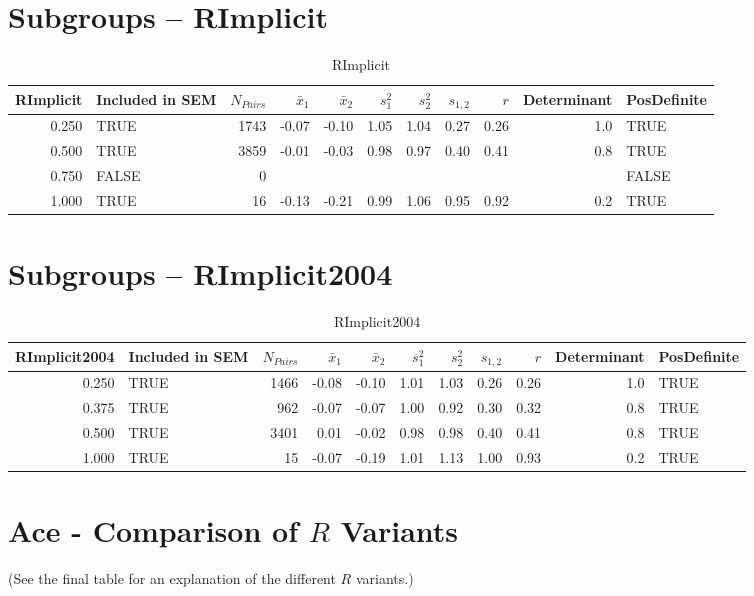 \documentclass{article}\usepackage[]{graphicx}\usepackage[]{color}
\begin{document}
\section{Subgroups --  RImplicit }%
\begin{table}[ht]
\centering
\begin{tabular}{rlrrrrrrrrl}
  \hline
RImplicit & Included in SEM & $N_{Pairs}$ & $\bar{x}_1$ & $\bar{x}_2$ & $s_1^2$ & $s_2^2$ & $s_{1,2}$ & $r$ & Determinant & PosDefinite \\ 
  \hline
0.250 & TRUE & 1743 & -0.07 & -0.10 & 1.05 & 1.04 & 0.27 & 0.26 & 1.0 & TRUE \\ 
  0.500 & TRUE & 3859 & -0.01 & -0.03 & 0.98 & 0.97 & 0.40 & 0.41 & 0.8 & TRUE \\ 
  0.750 & FALSE & 0 &  &  &  &  &  &  &  & FALSE \\ 
  1.000 & TRUE & 16 & -0.13 & -0.21 & 0.99 & 1.06 & 0.95 & 0.92 & 0.2 & TRUE \\ 
   \hline
\end{tabular}
\caption{RImplicit} 
\end{table}
\section{Subgroups --  RImplicit2004 }%
\begin{table}[ht]
\centering
\begin{tabular}{rlrrrrrrrrl}
  \hline
RImplicit2004 & Included in SEM & $N_{Pairs}$ & $\bar{x}_1$ & $\bar{x}_2$ & $s_1^2$ & $s_2^2$ & $s_{1,2}$ & $r$ & Determinant & PosDefinite \\ 
  \hline
0.250 & TRUE & 1466 & -0.08 & -0.10 & 1.01 & 1.03 & 0.26 & 0.26 & 1.0 & TRUE \\ 
  0.375 & TRUE & 962 & -0.07 & -0.07 & 1.00 & 0.92 & 0.30 & 0.32 & 0.8 & TRUE \\ 
  0.500 & TRUE & 3401 & 0.01 & -0.02 & 0.98 & 0.98 & 0.40 & 0.41 & 0.8 & TRUE \\ 
  1.000 & TRUE & 15 & -0.07 & -0.19 & 1.01 & 1.13 & 1.00 & 0.93 & 0.2 & TRUE \\ 
   \hline
\end{tabular}
\caption{RImplicit2004} 
\end{table}


\section{Ace - Comparison of $R$ Variants} 
(See the final table for an explanation of the different $R$ variants.)
\end{document}
